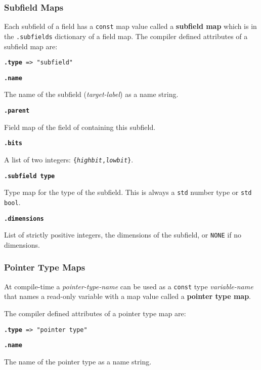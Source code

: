 \documentclass[12pt]{article}
\newcommand{\key}[1]{{\rm \bfseries #1}}
\newcommand{\ttkey}[1]{{\tt \bfseries #1}}
\newenvironment{indpar}[1][0.3in]%
	{\begin{list}{}%
		     {\setlength{\itemsep}{0in}%
		      \setlength{\topsep}{0in}%
		      \setlength{\parsep}{1ex}%
		      \setlength{\labelwidth}{#1}%
		      \setlength{\leftmargin}{#1}%
		      \addtolength{\leftmargin}{\labelsep}}%
	 \item}%
	{\end{list}}
\begin{document}
\subsubsection{Subfield Maps}
\label{SUBFIELD-MAPS}

Each subfield of a field has a {\tt const} map value called
a \key{subfield map} which is in the {\tt .subfields} dictionary of
a field map.  The compiler defined attributes of a subfield map are:

{\tt \ttkey{.type} => "subfield"}

\ttkey{.name}
\begin{indpar}
The name of the subfield ({\em target-label})
as a name string.
\end{indpar}

\ttkey{.parent}
\begin{indpar}
Field map of the field of containing this subfield.
\end{indpar}

\ttkey{.bits}
\begin{indpar}
A list of two integers: {\tt \{{\rm \em highbit},{\rm \em lowbit}\}}.
\end{indpar}

\ttkey{.subfield type}
\begin{indpar}
Type map for the type of the subfield.
This is always a {\tt std} number type or {\tt std bool}.
\end{indpar}

\ttkey{.dimensions}
\begin{indpar}
List of strictly positive integers,
the dimensions of the subfield, or {\tt NONE} if no dimensions.
\end{indpar}

\subsubsection{Pointer Type Maps}
\label{POINTER-TYPE-MAPS}

At compile-time a {\em pointer-type-name} can be used as a {\tt const} type
{\em variable-name} that names a read-only variable with a map value
called a \key{pointer type map}.

The compiler defined attributes of a pointer type map are:

{\tt \ttkey{.type} => "pointer type"}

\ttkey{.name}
\begin{indpar}
The name of the pointer type as a name string.
\end{indpar}
\end{document}
